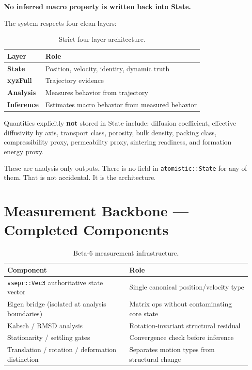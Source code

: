 \documentclass[11pt,a4paper]{article}
\begin{document}
\begin{docnote}
\textbf{No inferred macro property is written back into State.}
\end{docnote}

The system respects four clean layers:

\begin{table}[h!]
\centering
\begin{tabularx}{\linewidth}{lX}
\toprule
\textbf{Layer} & \textbf{Role} \\
\midrule
\textbf{State}    & Position, velocity, identity, dynamic truth \\
\textbf{xyzFull}  & Trajectory evidence \\
\textbf{Analysis} & Measures behavior from trajectory \\
\textbf{Inference}& Estimates macro behavior from measured behavior \\
\bottomrule
\end{tabularx}
\caption{Strict four-layer architecture.}
\end{table}

Quantities explicitly \textbf{not} stored in State include: diffusion coefficient, effective
diffusivity by axis, transport class, porosity, bulk density, packing class, compressibility
proxy, permeability proxy, sintering readiness, and formation energy proxy.

These are analysis-only outputs. There is no field in \texttt{atomistic::State} for any of
them. That is not accidental. It is the architecture.

\section{Measurement Backbone --- Completed Components}

\begin{table}[h!]
\centering
\begin{tabularx}{\linewidth}{lX}
\toprule
\textbf{Component} & \textbf{Role} \\
\midrule
\texttt{vsepr::Vec3} authoritative state vector & Single canonical position/velocity type \\
Eigen bridge (isolated at analysis boundaries)  & Matrix ops without contaminating core state \\
Kabsch / RMSD analysis                          & Rotation-invariant structural residual \\
Stationarity / settling gates                   & Convergence check before inference \\
Translation / rotation / deformation distinction& Separates motion types from structural change \\
\bottomrule
\end{tabularx}
\caption{Beta-6 measurement infrastructure.}
\end{table}
\end{document}
